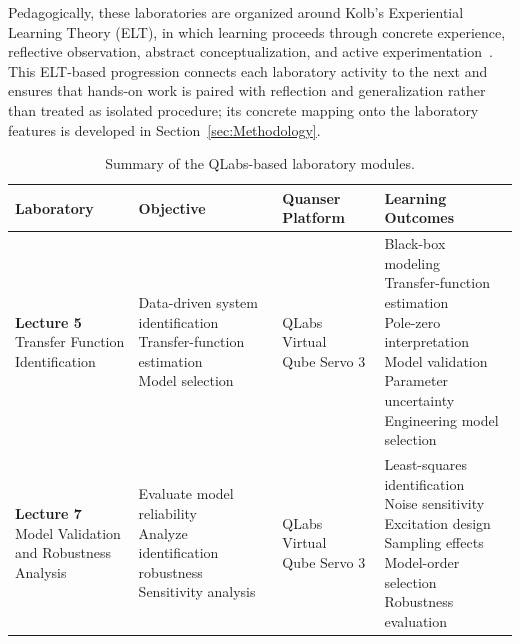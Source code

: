 \documentclass[journal]{IEEEtran}
\begin{document}
Pedagogically, these laboratories are organized around Kolb's Experiential Learning Theory (ELT), in which learning proceeds through concrete experience, reflective observation, abstract conceptualization, and active experimentation~\cite{kolb1984}. This ELT-based progression connects each laboratory activity to the next and ensures that hands-on work is paired with reflection and generalization rather than treated as isolated procedure; its concrete mapping onto the laboratory features is developed in Section~\ref{sec:Methodology}.

\begin{table}[t]
\centering
\caption{\small Summary of the QLabs-based laboratory modules.}
\label{tab:lab_summary}
\renewcommand{\arraystretch}{1.2}
\begin{tabular}{p{} p{} p{} p{}}
\hline
\textbf{Laboratory} &
\textbf{Objective} &
\textbf{Quanser Platform} &
\textbf{Learning Outcomes} \\
\hline

\makecell[l]{\textbf{Lecture 5}\\Transfer Function\\Identification}
&
\makecell[l]{Data-driven system identification\\Transfer-function estimation\\Model selection}
&
\makecell[l]{QLabs Virtual\\Qube Servo 3}
&
\makecell[l]{Black-box modeling\\Transfer-function estimation\\Pole-zero interpretation\\Model validation\\Parameter uncertainty\\Engineering model selection}
\\
\hline

\makecell[l]{\textbf{Lecture 7}\\Model Validation\\and Robustness Analysis}
&
\makecell[l]{Evaluate model reliability\\Analyze identification robustness\\Sensitivity analysis}
&
\makecell[l]{QLabs Virtual\\Qube Servo 3}
&
\makecell[l]{Least-squares identification\\Noise sensitivity\\Excitation design\\Sampling effects\\Model-order selection\\Robustness evaluation}
\\
\hline


\end{tabular}
\end{table}
\end{document}
